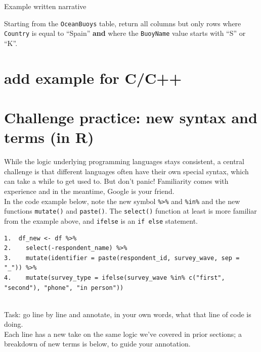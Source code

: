 \documentclass[
]{book}
\begin{document}
Example written narrative

Starting from the \texttt{OceanBuoys} table, return all columns but only rows where \texttt{Country} is equal to ``Spain'' \textbf{and} where the \texttt{BuoyName} value starts with ``S'' or ``K''.

\hfill\break

\section{add example for C/C++}\label{add-example-for-cc}

\section{Challenge practice: new syntax and terms (in R)}\label{challenge-practice-new-syntax-and-terms-in-r}

While the logic underlying programming languages stays consistent, a central challenge is that different languages often have their own special syntax, which can take a while to get used to. But don't panic! Familiarity comes with experience and in the meantime, Google is your friend.\\

In the code example below, note the new symbol \texttt{\%\textgreater{}\%} and \texttt{\%in\%} and the new functions \texttt{mutate()} and \texttt{paste()}. The \texttt{select()} function at least is more familiar from the example above, and \texttt{ifelse} is an \texttt{if\ else} statement.

\begin{verbatim}
1.  df_new <- df %>% 
2.    select(-respondent_name) %>% 
3.    mutate(identifier = paste(respondent_id, survey_wave, sep = "_")) %>% 
4.    mutate(survey_type = ifelse(survey_wave %in% c("first", "second"), "phone", "in person"))
  
\end{verbatim}

Task: go line by line and annotate, in your own words, what that line of code is doing.\\

Each line has a new take on the same logic we've covered in prior sections; a breakdown of new terms is below, to guide your annotation.
\end{document}
